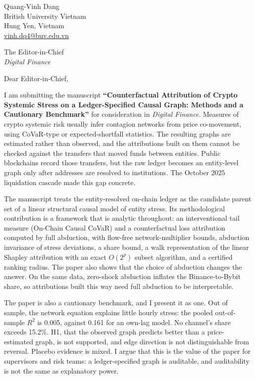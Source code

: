 \documentclass[11pt]{article}
\begin{document}
\vspace{1em}
\noindent Quang-Vinh Dang\\
British University Vietnam\\
Hung Yen, Vietnam\\
\href{mailto:vinh.dq4@buv.edu.vn}{vinh.dq4@buv.edu.vn}

\vspace{1em}
\noindent The Editor-in-Chief\\
\emph{Digital Finance}

\vspace{1em}
\noindent Dear Editor-in-Chief,

\vspace{0.5em}
I am submitting the manuscript \textbf{``Counterfactual Attribution of Crypto
Systemic Stress on a Ledger-Specified Causal Graph: Methods and a Cautionary
Benchmark''} for consideration in \emph{Digital Finance}. Measures of crypto
systemic risk usually infer contagion networks from price co-movement, using
CoVaR-type or expected-shortfall statistics. The resulting graphs are estimated
rather than observed, and the attributions built on them cannot be checked
against the transfers that moved funds between entities. Public blockchains
record those transfers, but the raw ledger becomes an entity-level graph only
after addresses are resolved to institutions. The October 2025 liquidation
cascade made this gap concrete.

The manuscript treats the entity-resolved on-chain ledger as the candidate parent
set of a linear structural causal model of entity stress. Its methodological
contribution is a framework that is analytic throughout: an interventional tail
measure (On-Chain Causal CoVaR) and a counterfactual loss attribution computed by
full abduction, with flow-free network-multiplier bounds, abduction invariance of
stress deviations, a share bound, a walk representation of the linear Shapley
attribution with an exact $O(2^p)$ subset algorithm, and a certified ranking
radius. The paper also shows that the choice of abduction changes the answer. On
the same data, zero-shock abduction inflates the Binance-to-Bybit share, so
attributions built this way need full abduction to be interpretable.

The paper is also a cautionary benchmark, and I present it as one. Out of
sample, the network equation explains little hourly stress: the pooled
out-of-sample $R^2$ is 0.005, against 0.161 for an own-lag model.
No channel's share exceeds 15.2\%. H1, that the observed graph predicts
better than a price-estimated graph, is not supported, and edge direction is not
distinguishable from reversal. Placebo evidence is mixed. I argue that this is
the value of the paper for supervisors and risk teams: a ledger-specified graph
is auditable, and auditability is not the same as explanatory power.
\end{document}
